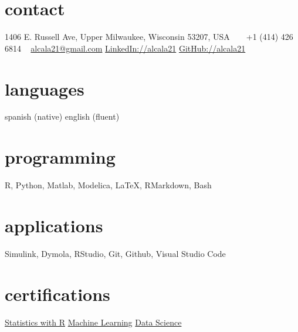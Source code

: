 \documentclass[]{friggeri-cv} %
\begin{document}


\begin{aside} %
\section{contact}
1406 E. Russell Ave, Upper
Milwaukee, Wisconsin 53207, USA
~
\Mobilefone~ +1 (414) 426 6814
~
\href{mailto:alcala21@gmail.com}{alcala21@gmail.com}
\href{https://www.linkedin.com/in/alcala21}{LinkedIn://alcala21}
\href{https://www.github.com/alcala21}{GitHub://alcala21}
\section{languages}
spanish (native)
english (fluent)
\section{programming}
R, Python, Matlab,
Modelica, \LaTeX,
RMarkdown, Bash
\section{applications}
Simulink, Dymola,
RStudio, Git, Github,
Visual Studio Code
\section{certifications}
\href{https://www.coursera.org/account/accomplishments/specialization/certificate/UWG3PS5EXMBJ}{Statistics with R}
\href{https://www.coursera.org/account/accomplishments/specialization/certificate/2VHFDHW5GUK6}{Machine Learning}
\href{https://www.coursera.org/account/accomplishments/specialization/certificate/W9DB45S3CGDZ}{Data Science}
\end{aside}

\end{document}
